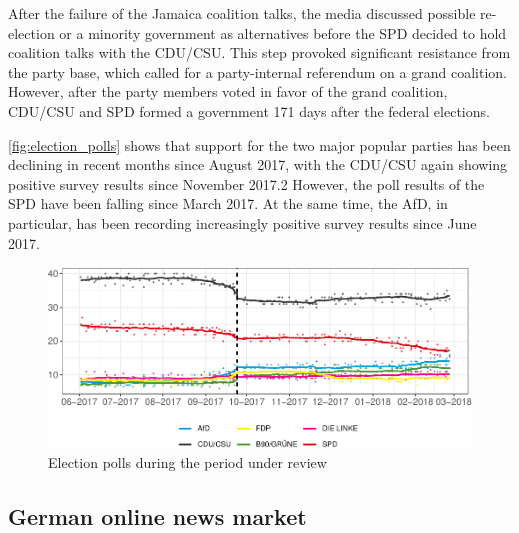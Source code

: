 \documentclass[
  12pt,
]{article}
\begin{document}
After the failure of the Jamaica coalition talks, the media discussed
possible re-election or a minority government as alternatives before the
SPD decided to hold coalition talks with the CDU/CSU. This step provoked
significant resistance from the party base, which called for a
party-internal referendum on a grand coalition. However, after the party
members voted in favor of the grand coalition, CDU/CSU and SPD formed a
government 171 days after the federal elections.

\autoref{fig:election_polls} shows that support for the two major
popular parties has been declining in recent months since August 2017,
with the CDU/CSU again showing positive survey results since November
2017.2 However, the poll results of the SPD have been falling since
March 2017. At the same time, the AfD, in particular, has been recording
increasingly positive survey results since June 2017.

\begin{figure}

{\centering \includegraphics[width=0.8\linewidth]{main_text_files/figure-latex/election polls-1} 

}

\caption{Election polls during the period under review \label{fig:election_polls}}\label{fig:election polls}
\end{figure}

\hypertarget{german-online-news-market}{%
\subsection{German online news market}\label{german-online-news-market}}
\end{document}
